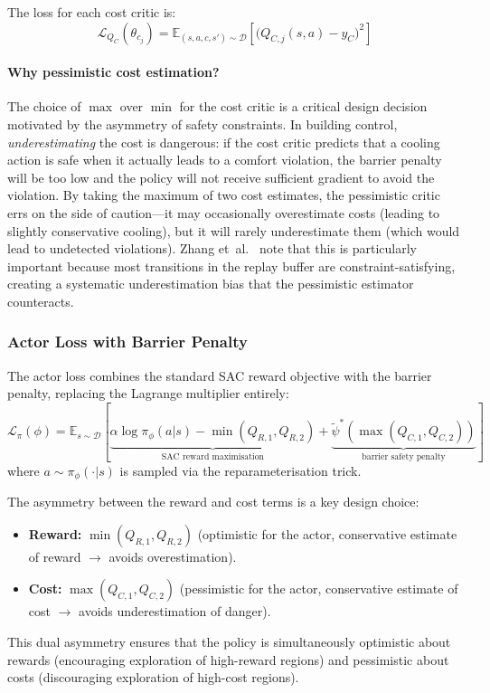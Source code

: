 The loss for each cost critic is:
\begin{equation}
  \mathcal{L}_{Q_C}(\theta_{c_j}) = \mathbb{E}_{(s,a,c,s') \sim \mathcal{D}}
    \!\left[\bigl(Q_{C,j}(s,a) - y_C\bigr)^2\right]
  \label{eq:cost-critic-loss}
\end{equation}

\paragraph{Why pessimistic cost estimation?}
The choice of $\max$ over $\min$ for the cost critic is a critical design
decision motivated by the asymmetry of safety constraints.  In building
control, \emph{underestimating} the cost is dangerous: if the cost critic
predicts that a cooling action is safe when it actually leads to a comfort
violation, the barrier penalty will be too low and the policy will not receive
sufficient gradient to avoid the violation.  By taking the maximum of two
cost estimates, the pessimistic critic errs on the side of caution---it may
occasionally overestimate costs (leading to slightly conservative cooling),
but it will rarely underestimate them (which would lead to undetected
violations).  Zhang et~al.~\cite{zhang2024csaclb} note that this is
particularly important because most transitions in the replay buffer are
constraint-satisfying, creating a systematic underestimation bias that the
pessimistic estimator counteracts.

\subsubsection{Actor Loss with Barrier Penalty}

The actor loss combines the standard SAC reward objective with the barrier
penalty, replacing the Lagrange multiplier entirely:
\begin{equation}
  \mathcal{L}_\pi(\phi) = \mathbb{E}_{s \sim \mathcal{D}}\!\left[
    \underbrace{\alpha \log \pi_\phi(a|s)
      - \min(Q_{R,1}, Q_{R,2})}_{\text{SAC reward maximisation}}
    + \underbrace{\tilde{\psi}^*\!\left(
      \max(Q_{C,1}, Q_{C,2})\right)}_{\text{barrier safety penalty}}
  \right]
  \label{eq:csac-loss}
\end{equation}
where $a \sim \pi_\phi(\cdot|s)$ is sampled via the reparameterisation trick.

The asymmetry between the reward and cost terms is a key design choice:
\begin{itemize}
  \item \textbf{Reward:} $\min(Q_{R,1}, Q_{R,2})$ (optimistic for the actor,
    conservative estimate of reward $\to$ avoids overestimation).
  \item \textbf{Cost:} $\max(Q_{C,1}, Q_{C,2})$ (pessimistic for the actor,
    conservative estimate of cost $\to$ avoids underestimation of danger).
\end{itemize}
This dual asymmetry ensures that the policy is simultaneously optimistic about
rewards (encouraging exploration of high-reward regions) and pessimistic about
costs (discouraging exploration of high-cost regions).

